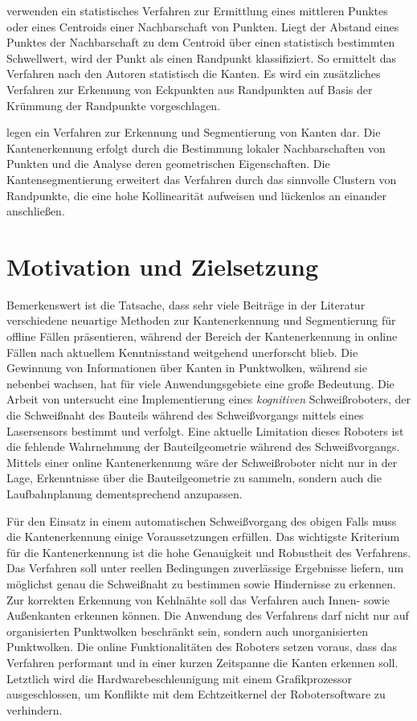 \Textcite{ahmed_edge_2018} verwenden ein statistisches Verfahren zur Ermittlung eines mittleren Punktes oder eines Centroids einer Nachbarschaft von Punkten. Liegt der Abstand eines Punktes der Nachbarschaft zu dem Centroid über einen statistisch bestimmten Schwellwert, wird der Punkt als einen Randpunkt klassifiziert. So ermittelt das Verfahren nach den Autoren statistisch die Kanten. Es wird ein zusätzliches Verfahren zur Erkennung von Eckpunkten aus Randpunkten auf Basis der Krümmung der Randpunkte vorgeschlagen.

\Textcite{ni_edge_2016} legen ein Verfahren zur Erkennung und Segmentierung von Kanten dar. Die Kantenerkennung erfolgt durch die Bestimmung lokaler Nachbarschaften von Punkten und die Analyse deren geometrischen Eigenschaften. Die Kantensegmentierung erweitert das Verfahren durch das sinnvolle Clustern von Randpunkte, die eine hohe Kollinearität aufweisen und lückenlos an einander anschließen. 

\section{Motivation und Zielsetzung} \label{Motivation}
Bemerkenswert ist die Tatsache, dass sehr viele Beiträge in der Literatur verschiedene neuartige Methoden zur Kantenerkennung und Segmentierung für offline Fällen präsentieren, während der Bereich der Kantenerkennung in online Fällen nach aktuellem Kenntnisstand weitgehend unerforscht blieb. Die Gewinnung von Informationen über Kanten in Punktwolken, während sie nebenbei wachsen, hat für viele Anwendungsgebiete eine große Bedeutung. Die Arbeit von \textcite{savla_intelligente_2022} untersucht eine Implementierung eines \textit{kognitiven} Schweißroboters, der die Schweißnaht des Bauteils während des Schweißvorgangs mittels eines Lasersensors bestimmt und verfolgt. Eine aktuelle Limitation dieses Roboters ist die fehlende Wahrnehmung der Bauteilgeometrie während des Schweißvorgangs. Mittels einer online Kantenerkennung wäre der Schweißroboter nicht nur in der Lage, Erkenntnisse über die Bauteilgeometrie zu sammeln, sondern auch die Laufbahnplanung dementsprechend anzupassen.

Für den Einsatz in einem automatischen Schweißvorgang des obigen Falls muss die Kantenerkennung einige Voraussetzungen erfüllen. Das wichtigste Kriterium für die Kantenerkennung ist die hohe Genauigkeit und Robustheit des Verfahrens. Das Verfahren soll unter reellen Bedingungen zuverlässige Ergebnisse liefern, um möglichst genau die Schweißnaht zu bestimmen sowie Hindernisse zu erkennen. Zur korrekten Erkennung von Kehlnähte soll das Verfahren auch Innen- sowie Außenkanten erkennen können. Die Anwendung des Verfahrens darf nicht nur auf organisierten Punktwolken beschränkt sein, sondern auch unorganisierten Punktwolken. Die online Funktionalitäten des Roboters setzen voraus, dass das Verfahren performant und in einer kurzen Zeitspanne die Kanten erkennen soll. Letztlich wird die Hardwarebeschleunigung mit einem Grafikprozessor ausgeschlossen, um Konflikte mit dem Echtzeitkernel der Robotersoftware zu verhindern. 

